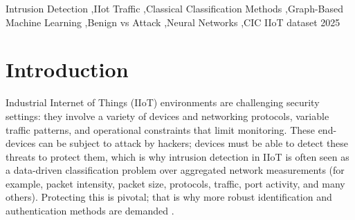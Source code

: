 \documentclass[final,5p,times,twocolumn]{elsarticle}
\begin{document}
\begin{frontmatter}
\begin{abstract}
The later rich-graph GNN experiments extended this representation by adding nodes for IP, port, protocol, and time. Using this new representation, we obtained a different result: the graph-based GNN outperformed all previous models tested in this study under the current random window-level split, including k-Nearest Neighbors and baseline Logistic Regression. The strongest model was the GraphSAGE-rich architecture (accuracy = 0.997, precision = 0.997, recall = 0.997), followed by GAT-rich (accuracy = 0.962, precision = 0.956, recall = 0.950). These results suggest that adding device, behavioral-state, IP, port, protocol, and temporal nodes improved attack detection beyond the earlier simple graph design and the best classical baseline, k-NN. Other findings were that features such as packet length, address information, TCP activity, and port diversity are strong predictors of attacks; in contrast, the strongest benign predictive features show low-intensity and stable communication patterns, such as fewer packets per window, lower IP and port diversity, and lower TCP-flag activity.
\end{abstract}



\begin{keyword}
Intrusion Detection \sep IIot Traffic \sep Classical Classification Methods \sep Graph-Based Machine Learning \sep Benign vs Attack \sep Neural Networks \sep CIC IIoT dataset 2025
\end{keyword}

\end{frontmatter}

\section{Introduction}
\label{introduction}

Industrial Internet of Things (IIoT) environments are challenging security settings: they involve a variety of devices and networking protocols, variable traffic patterns, and operational constraints that limit monitoring. These end-devices can be subject to attack by hackers; devices must be able to detect these threats to protect them, which is why intrusion detection in IIoT is often seen as a data-driven classification problem over aggregated network measurements (for example, packet intensity, packet size, protocols, traffic, port activity, and many others). Protecting this is pivotal; that is why more robust identification and authentication methods are demanded \citep{jhariya_secure_2026}.
\end{document}
